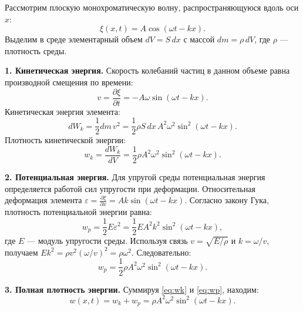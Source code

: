 \begin{theorem}
Рассмотрим плоскую монохроматическую волну, распространяющуюся вдоль оси $x$:
\begin{equation}
    \xi(x,t) = A \cos(\omega t - kx). \label{eq:wave_28}
\end{equation}
Выделим в среде элементарный объем $dV = S \, dx$ с массой $dm = \rho \, dV$, где $\rho$ --- плотность среды.

\textbf{1. Кинетическая энергия.} Скорость колебаний частиц в данном объеме равна производной смещения по времени:
\begin{equation}
    v = \frac{\partial \xi}{\partial t} = -A\omega \sin(\omega t - kx).
\end{equation}
Кинетическая энергия элемента:
\begin{equation}
    dW_k = \frac{1}{2} dm \, v^2 = \frac{1}{2} \rho S \, dx \, A^2 \omega^2 \sin^2(\omega t - kx).
\end{equation}
Плотность кинетической энергии:
\begin{equation}
    w_k = \frac{dW_k}{dV} = \frac{1}{2} \rho A^2 \omega^2 \sin^2(\omega t - kx). \label{eq:wk}
\end{equation}

\textbf{2. Потенциальная энергия.} Для упругой среды потенциальная энергия определяется работой сил упругости при деформации. Относительная деформация элемента $\varepsilon = \frac{\partial \xi}{\partial x} = Ak \sin(\omega t - kx)$. Согласно закону Гука, плотность потенциальной энергии равна:
\begin{equation}
    w_p = \frac{1}{2} E \varepsilon^2 = \frac{1}{2} E A^2 k^2 \sin^2(\omega t - kx),
\end{equation}
где $E$ --- модуль упругости среды. Используя связь $v = \sqrt{E/\rho}$ и $k = \omega/v$, получаем $E k^2 = \rho v^2 (\omega/v)^2 = \rho \omega^2$. Следовательно:
\begin{equation}
    w_p = \frac{1}{2} \rho A^2 \omega^2 \sin^2(\omega t - kx). \label{eq:wp}
\end{equation}

\textbf{3. Полная плотность энергии.} Суммируя \eqref{eq:wk} и \eqref{eq:wp}, находим:
\begin{equation}
    w(x,t) = w_k + w_p = \rho A^2 \omega^2 \sin^2(\omega t - kx). \label{eq:total_w}
\end{equation}
\end{theorem}

